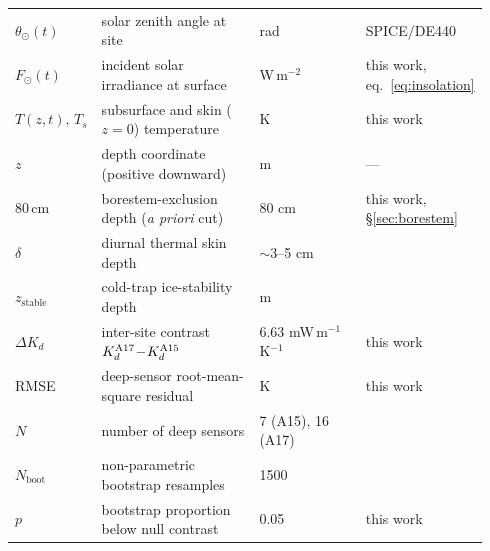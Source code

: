 \documentclass[11pt]{article}
\newcommand{\zborestem}{80\,\si{\centi\meter}}
\begin{document}
{\begin{tabular}{@{}p{0.10\linewidth}p{0.40\linewidth}p{0.28\linewidth}p{0.16\linewidth}@{}}
$\theta_\odot(t)$  & solar zenith angle at site                            & rad                                          & SPICE/DE440 \\
$F_\odot(t)$       & incident solar irradiance at surface                  & W\,m$^{-2}$                                  & this work, eq.~\ref{eq:insolation} \\
$T(z,t),\,T_s$     & subsurface and skin ($z\!=\!0$) temperature           & K                                            & this work \\
$z$                & depth coordinate (positive downward)                  & m                                            & --- \\
$\zborestem$       & borestem-exclusion depth (\emph{a priori} cut)        & 80 cm                                        & this work, §\ref{sec:borestem} \\
$\delta$           & diurnal thermal skin depth                            & $\sim$3--5 cm                                & \citet{hayne2017} \\
$z_\mathrm{stable}$ & cold-trap ice-stability depth                         & m                                            & \citet{schorghofer2005} \\
$\Delta K_d$       & inter-site contrast $K_d^{\rm A17}\!-\!K_d^{\rm A15}$ & 6.63 mW\,m$^{-1}$\,K$^{-1}$                  & this work \\
RMSE               & deep-sensor root-mean-square residual                 & K                                            & this work \\
$N$                & number of deep sensors                                & 7 (A15), 16 (A17)                            & \citet{nagihara2018} \\
$N_\mathrm{boot}$  & non-parametric bootstrap resamples                    & 1500                                         & \citet{efron1993} \\
$p$                & bootstrap proportion below null contrast              & 0.05                                         & this work \\
\bottomrule
\end{tabular}

}
\end{document}
